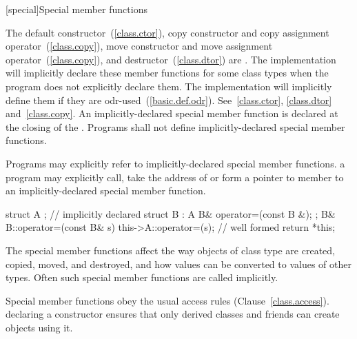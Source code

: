 [special]{Special member functions}


%
%
%
%
%

\pnum
{}%
%
%
%
%
The default constructor~(\ref{class.ctor}),
copy constructor and copy assignment operator~(\ref{class.copy}),
move constructor and move assignment operator~(\ref{class.copy}),
and destructor~(\ref{class.dtor}) are
.
\enternote The implementation will implicitly declare these member functions for some class
types when the program does not explicitly declare them.
The implementation will implicitly define them if they are odr-used~(\ref{basic.def.odr}).
See~\ref{class.ctor}, \ref{class.dtor} and~\ref{class.copy}. \exitnote
An implicitly-declared special member function is declared at the closing
\tcode{\}} of the .
Programs shall not define implicitly-declared special member functions.

\pnum
Programs may explicitly refer to implicitly-declared special member functions.
\enterexample
a program may explicitly call, take the address of or form a pointer to member
to an implicitly-declared special member function.

\begin{codeblock}
struct A { };                   // implicitly declared 
struct B : A {
  B& operator=(const B &);
};
B& B::operator=(const B& s) {
  this->A::operator=(s);        // well formed
  return *this;
}
\end{codeblock}
\exitexample

\pnum
\enternote
The special member functions affect the way objects of class type are created,
copied, moved, and destroyed, and how values can be converted to values of other types.
Often such special member functions are called implicitly.
\exitnote

\pnum
{}%
Special member functions obey the usual access rules (Clause~\ref{class.access}).
\enterexample
declaring a constructor
ensures that only derived classes and friends can create objects using it.
\exitexample

